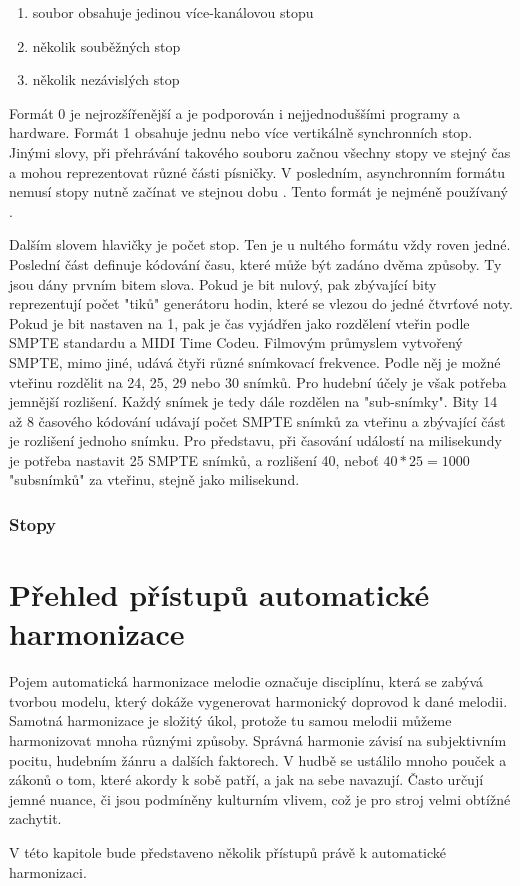 \begin{enumerate}\addtocounter{enumi}{-1}
    \item soubor obsahuje jedinou více-kanálovou stopu
    \item několik souběžných stop
    \item několik nezávislých stop
\end{enumerate}

Formát 0 je nejrozšířenější a je podporován i nejjednoduššími programy a hardware.
\cite{Back_SMF_Specif}
Formát 1 obsahuje jednu nebo více vertikálně synchronních stop.
Jinými slovy, při přehrávání takového souboru začnou všechny stopy ve stejný čas 
a mohou reprezentovat různé části písničky.
V posledním, asynchronním formátu nemusí stopy nutně začínat ve stejnou dobu
\cite{Neznamy_aboutMIDIFiles}.
Tento formát je nejméně používaný
\cite{MIDI_tutorials}.
\par

Dalším slovem hlavičky je počet stop.
Ten je u nultého formátu vždy roven jedné.
Poslední část definuje kódování času, 
které může být zadáno dvěma způsoby.
Ty jsou dány prvním bitem slova.
Pokud je bit nulový, pak zbývající bity reprezentují počet "tiků" generátoru hodin, 
které se vlezou do jedné čtvrťové noty.
Pokud je bit nastaven na 1, pak je čas vyjádřen jako rozdělení vteřin podle SMPTE standardu
a MIDI Time Codeu.
\cite{Back_SMF_Specif}
Filmovým průmyslem vytvořený SMPTE, mimo jiné, udává čtyři různé snímkovací frekvence.
Podle něj je možné vteřinu rozdělit na 24, 25, 29 nebo 30 snímků.
Pro hudební účely je však potřeba jemnější rozlišení.
Každý snímek je tedy dále rozdělen na "sub-snímky".
\cite{Neznamy_aboutMIDIFiles}
Bity 14 až 8 časového kódování udávají počet SMPTE snímků za vteřinu 
a zbývající část je rozlišení jednoho snímku.
Pro představu, při časování událostí na milisekundy je potřeba nastavit 25 SMPTE snímků,
a rozlišení 40, neboť $ 40 * 25 = 1000 $ "subsnímků" za vteřinu, stejně jako milisekund. 
\cite{Back_SMF_Specif}
\par

\subsection{Stopy}



\chapter{Přehled přístupů automatické harmonizace}
Pojem automatická harmonizace melodie označuje disciplínu, která se zabývá tvorbou modelu, 
který dokáže vygenerovat harmonický doprovod k dané melodii.
Samotná harmonizace je složitý úkol, 
protože tu samou melodii můžeme harmonizovat mnoha různými způsoby.
Správná harmonie závisí na subjektivním pocitu, hudebním žánru a dalších faktorech.
V hudbě se ustálilo mnoho pouček a zákonů o tom, které akordy k sobě patří,
a jak na sebe navazují.
Často určují jemné nuance, či jsou podmíněny kulturním vlivem, 
což je pro stroj velmi obtížné zachytit.
\cite{YinCheng_comparativeStudy}
\par
V této kapitole bude představeno několik přístupů právě k automatické harmonizaci.

